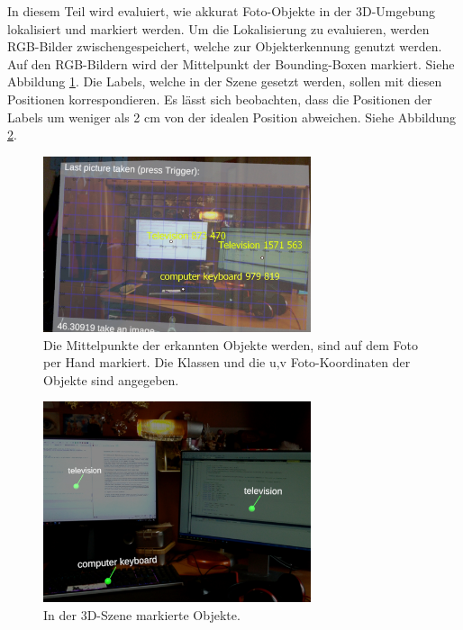 In diesem Teil wird evaluiert, wie akkurat Foto-Objekte in der 3D-Umgebung lokalisiert und markiert werden.
Um die Lokalisierung zu evaluieren, werden RGB-Bilder zwischengespeichert, welche zur Objekterkennung genutzt werden. Auf den RGB-Bildern wird der Mittelpunkt der Bounding-Boxen markiert. Siehe Abbildung \ref{img:markedonimage}. Die Labels, welche in der Szene gesetzt werden, sollen mit diesen Positionen korrespondieren.
Es lässt sich beobachten, dass die Positionen der Labels um weniger als 2 cm von der idealen Position abweichen. Siehe Abbildung \ref{img:labelsszene}. 
\begin{figure}[H]
	\centering
	\includegraphics[width=0.7\textwidth]{images/ML_markedOnImage2.jpg}
	\caption[Erkennt Objekte auf RGB-Bilde markiert]{Die Mittelpunkte der erkannten Objekte werden, sind auf dem Foto per Hand markiert. Die Klassen und die u,v Foto-Koordinaten der Objekte sind angegeben.}
	\label{img:markedonimage}
\end{figure}

\begin{figure}[H]
	\centering
	\includegraphics[width=0.7\textwidth]{images/ML_20201014_13.39.00.jpg}
	\caption[Erkannte Objekte in der Szene markiert]{In der 3D-Szene markierte Objekte.}
	\label{img:labelsszene}
\end{figure}

